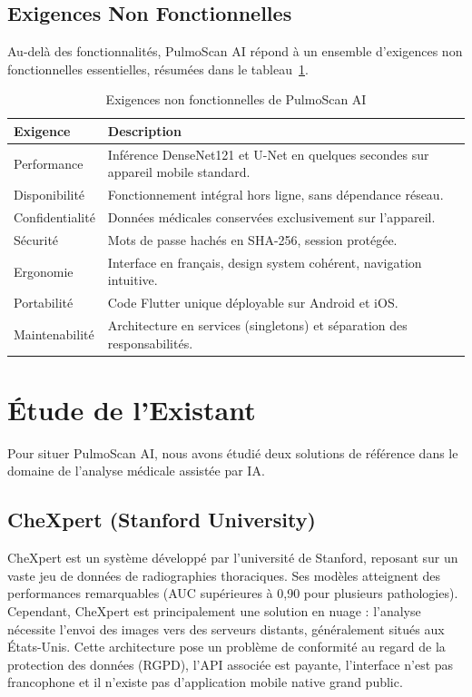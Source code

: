 \documentclass[12pt,a4paper]{report}
\begin{document}
\subsection{Exigences Non Fonctionnelles}
Au-delà des fonctionnalités, PulmoScan AI répond à un ensemble d'exigences non fonctionnelles essentielles, résumées dans le tableau~\ref{tab:nfr}.

\begin{table}[H]
\centering
\caption{Exigences non fonctionnelles de PulmoScan AI}
\label{tab:nfr}
\begin{tabularx}{\textwidth}{l X}
\toprule
\textbf{Exigence} & \textbf{Description} \\
\midrule
Performance & Inférence DenseNet121 et U-Net en quelques secondes sur appareil mobile standard. \\
Disponibilité & Fonctionnement intégral hors ligne, sans dépendance réseau. \\
Confidentialité & Données médicales conservées exclusivement sur l'appareil. \\
Sécurité & Mots de passe hachés en SHA-256, session protégée. \\
Ergonomie & Interface en français, design system cohérent, navigation intuitive. \\
Portabilité & Code Flutter unique déployable sur Android et iOS. \\
Maintenabilité & Architecture en services (singletons) et séparation des responsabilités. \\
\bottomrule
\end{tabularx}
\end{table}

\section{Étude de l'Existant}
Pour situer PulmoScan AI, nous avons étudié deux solutions de référence dans le domaine de l'analyse médicale assistée par IA.

\subsection{CheXpert (Stanford University)}
CheXpert est un système développé par l'université de Stanford, reposant sur un vaste jeu de données de radiographies thoraciques. Ses modèles atteignent des performances remarquables (AUC supérieures à 0,90 pour plusieurs pathologies). Cependant, CheXpert est principalement une solution en nuage : l'analyse nécessite l'envoi des images vers des serveurs distants, généralement situés aux États-Unis. Cette architecture pose un problème de conformité au regard de la protection des données (RGPD), l'API associée est payante, l'interface n'est pas francophone et il n'existe pas d'application mobile native grand public.
\end{document}
